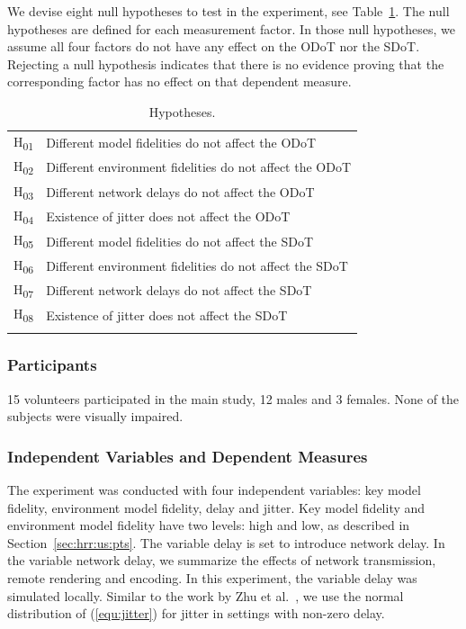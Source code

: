 We devise eight null hypotheses to test in the experiment, see Table~\ref{tab:hypo}. The null hypotheses are defined for each measurement factor. In those null hypotheses, we assume all four factors do not have any effect on the ODoT nor the SDoT. Rejecting a null hypothesis indicates that there is no evidence proving that the corresponding factor has no effect on that dependent measure.

\begin{table}[!htbp]
\caption{Hypotheses.}
\label{tab:hypo}
\begin{tabular}{ll}
\noalign{\smallskip}\hline\noalign{\smallskip}
H\textsubscript{01} & Different model fidelities do not affect the ODoT \\
H\textsubscript{02} & Different environment fidelities do not affect the ODoT \\
H\textsubscript{03} & Different network delays do not affect the ODoT \\
H\textsubscript{04} & Existence of jitter does not affect the ODoT \\
H\textsubscript{05} & Different model fidelities do not affect the SDoT \\
H\textsubscript{06} & Different environment fidelities do not affect the SDoT \\
H\textsubscript{07} & Different network delays do not affect the SDoT \\
H\textsubscript{08} & Existence of jitter does not affect the SDoT \\
\noalign{\smallskip}\hline
\end{tabular}
\end{table}

\subsubsection{Participants}

15 volunteers participated in the main study, 12 males and 3 females. None of the subjects were visually impaired.

\subsubsection{Independent Variables and Dependent Measures}
\label{sec:hrr:us:ms:ivdm}

The experiment was conducted with four independent variables: key model fidelity, environment model fidelity, delay and jitter.
Key model fidelity and environment model fidelity have two levels: high and low, as described in Section~\ref{sec:hrr:us:pts}.
The variable delay is set to introduce network delay. In the variable network delay, we summarize the effects of network transmission, remote rendering and encoding. In this experiment, the variable delay was simulated locally. Similar to the work by Zhu et al.~\cite{zhu1998jitter}, we use the normal distribution of (\ref{equ:jitter}) for jitter in settings with non-zero delay.

